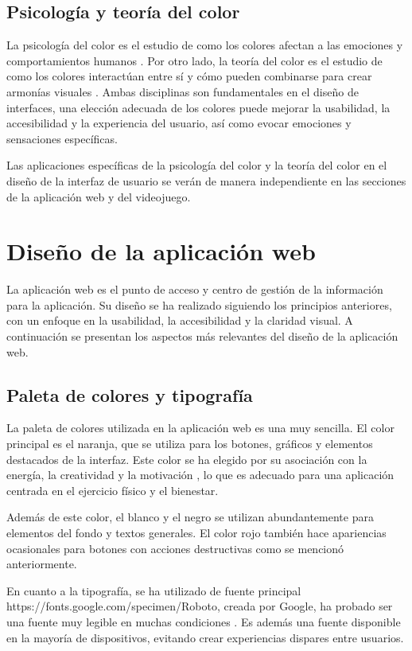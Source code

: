 \subsection{Psicología y teoría del color}
La psicología del color es el estudio de como los colores afectan a las
emociones y comportamientos humanos \parencite{ROOHI2019100298}. Por otro lado,
la teoría del color es el estudio de como los colores interactúan entre sí y
cómo pueden combinarse para crear armonías visuales
\parencite{ColorTheoryHandprint}. Ambas disciplinas son fundamentales en el
diseño de interfaces, una elección adecuada de los colores puede mejorar la
usabilidad, la accesibilidad y la experiencia del usuario, así como evocar
emociones y sensaciones específicas.

Las aplicaciones específicas de la psicología del color y la teoría del color en
el diseño de la interfaz de usuario se verán de manera independiente en las
secciones de la aplicación web y del videojuego.


\section{Diseño de la aplicación web}
\label{anexo2:sec:diseno-aplicacion-web}
La aplicación web es el punto de acceso y centro de gestión de la información
para la aplicación. Su diseño se ha realizado siguiendo los principios
anteriores, con un enfoque en la usabilidad, la accesibilidad y la claridad
visual. A continuación se presentan los aspectos más relevantes del diseño de la
aplicación web.

\subsection{Paleta de colores y tipografía}
La paleta de colores utilizada en la aplicación web es una muy sencilla. El
color principal es el naranja, que se utiliza para los botones, gráficos y
elementos destacados de la interfaz.  Este color se ha elegido por su asociación
con la energía, la creatividad y la motivación \parencites{colorpsychology2015}%
{orangeColorPsychology}, lo que es adecuado para una aplicación centrada en el
ejercicio físico y el bienestar.

Además de este color, el blanco y el negro se utilizan abundantemente para
elementos del fondo y textos generales. El color rojo también hace apariencias
ocasionales para botones con acciones destructivas como se mencionó
anteriormente.

En cuanto a la tipografía, se ha utilizado de fuente principal %
{https://fonts.google.com/specimen/Roboto}, creada por Google, ha probado ser
una fuente muy legible en muchas condiciones \parencite{Shu2024Nov}. Es además
una fuente disponible en la mayoría de dispositivos, evitando crear experiencias
dispares entre usuarios.

